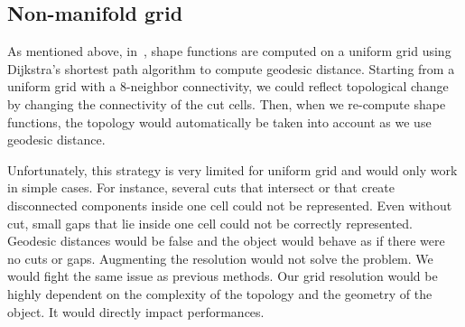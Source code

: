 
\subsection{Non-manifold grid}

As mentioned above, in~\cite{Faure2011}, shape functions are computed on a uniform grid using Dijkstra's shortest path algorithm to compute geodesic distance. Starting from a uniform grid with a 8-neighbor connectivity, we could reflect topological change by changing the connectivity of the cut cells. Then, when we re-compute shape functions, the topology would automatically be taken into account as we use geodesic distance. 

Unfortunately, this strategy is very limited for uniform grid and would only work in simple cases. For instance, several cuts that intersect or that create disconnected components inside one cell could not be represented. Even without cut, small gaps that lie inside one cell could not be correctly represented. Geodesic distances would be false and the object would behave as if there were no cuts or gaps. Augmenting the resolution would not solve the problem. We would fight the same issue as previous methods. Our grid resolution would be highly dependent on the complexity of the topology and the geometry of the object. It would directly impact performances.

